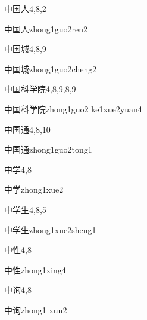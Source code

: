 \begin{entry}{中国人}{4,8,2}
  \begin{phonetics}{中国人}{zhong1guo2ren2}
  \end{phonetics}
\end{entry}

\begin{entry}{中国城}{4,8,9}
  \begin{phonetics}{中国城}{zhong1guo2cheng2}
  \end{phonetics}
\end{entry}

\begin{entry}{中国科学院}{4,8,9,8,9}
  \begin{phonetics}{中国科学院}{zhong1guo2 ke1xue2yuan4}
  \end{phonetics}
\end{entry}

\begin{entry}{中国通}{4,8,10}
  \begin{phonetics}{中国通}{zhong1guo2tong1}
  \end{phonetics}
\end{entry}

\begin{entry}{中学}{4,8}
  \begin{phonetics}{中学}{zhong1xue2}
  \end{phonetics}
\end{entry}

\begin{entry}{中学生}{4,8,5}
  \begin{phonetics}{中学生}{zhong1xue2sheng1}
  \end{phonetics}
\end{entry}

\begin{entry}{中性}{4,8}
  \begin{phonetics}{中性}{zhong1xing4}
  \end{phonetics}
\end{entry}

\begin{entry}{中询}{4,8}
  \begin{phonetics}{中询}{zhong1 xun2}
  \end{phonetics}
\end{entry}

